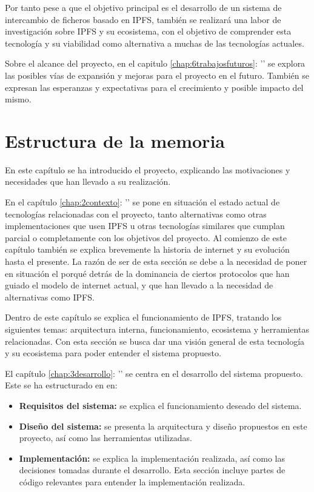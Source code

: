 Por tanto pese a que el objetivo principal es el desarrollo de un sistema de intercambio de ficheros basado en IPFS,
también se realizará una labor de investigación sobre  IPFS y su ecosistema, con el objetivo de comprender esta
tecnología y su viabilidad como alternativa a muchas de las tecnologías actuales.

Sobre el alcance del proyecto, en el capitulo \ref{chap:6trabajosfuturos}: '' se explora las posibles vías de expansión y mejoras para el proyecto en el futuro. También se expresan las esperanzas y expectativas para el crecimiento y posible impacto del mismo.

\section{Estructura de la memoria}
En este capítulo se ha introducido el proyecto, explicando las motivaciones y necesidades que han llevado a su realización.

En el capítulo \ref{chap:2contexto}: '' se pone en situación el estado actual de tecnologías relacionadas con el proyecto, tanto alternativas
como otras implementaciones que usen IPFS u otras tecnologías similares que cumplan parcial o completamente con los objetivos del proyecto.
Al comienzo de este capítulo también se explica brevemente la historia de internet y su evolución hasta el presente.
La razón de ser de esta sección se debe a la necesidad de poner en situación el porqué detrás de la dominancia de ciertos
protocolos que han guiado el modelo de internet actual, y que han llevado a la necesidad de alternativas como IPFS.

Dentro de este capítulo se explica el funcionamiento de IPFS, tratando los siguientes temas: arquitectura interna, funcionamiento,
ecosistema y herramientas relacionadas. Con esta sección se busca dar una visión general de esta tecnología y su ecosistema para
poder entender el sistema propuesto.

El capítulo \ref{chap:3desarrollo}: '' se centra en el desarrollo del sistema propuesto. Este se ha estructurado en en:
\begin{itemize}
      \item \textbf{Requisitos del sistema:} se explica el funcionamiento deseado del sistema.
      \item \textbf{Diseño del sistema:} se presenta la arquitectura y diseño propuestos en este proyecto, así como las herramientas utilizadas.
      \item \textbf{Implementación:} se explica la implementación realizada, así como las decisiones tomadas durante el desarrollo. Esta sección
            incluye partes de código relevantes para entender la implementación realizada.
\end{itemize}

